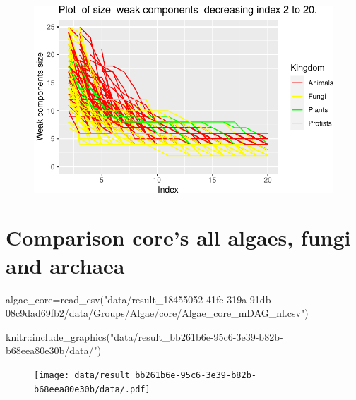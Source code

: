 \documentclass[
  letterpaper,
  DIV=11,
  numbers=noendperiod]{scrreprt}
\newenvironment{Shaded}{}{}
\newcommand{\FunctionTok}[1]{\textcolor[rgb]{0.38,0.69,0.94}{#1}}
\newcommand{\NormalTok}[1]{\textcolor[rgb]{0.67,0.70,0.75}{#1}}
\newcommand{\OtherTok}[1]{\textcolor[rgb]{0.15,0.68,0.38}{#1}}
\newcommand{\SpecialCharTok}[1]{\textcolor[rgb]{0.34,0.71,0.76}{#1}}
\newcommand{\StringTok}[1]{\textcolor[rgb]{0.60,0.76,0.47}{#1}}
\begin{document}
\begin{figure}[H]

{\centering \includegraphics[width=1\textwidth,height=\textheight]{index_files/figure-pdf/unnamed-chunk-52-1.pdf}

}

\end{figure}

\hypertarget{comparison-cores-all-algaes-fungi-and-archaea}{%
\section{Comparison core's all algaes, fungi and
archaea}\label{comparison-cores-all-algaes-fungi-and-archaea}}

\begin{Shaded}
\begin{Highlighting}[]
\NormalTok{algae\_core}\OtherTok{=}\FunctionTok{read\_csv}\NormalTok{(}\StringTok{"data/result\_18455052{-}41fe{-}319a{-}91db{-}08c9dad69fb2/data/Groups/Algae/core/Algae\_core\_mDAG\_nl.csv"}\NormalTok{) }
\end{Highlighting}
\end{Shaded}

\begin{Shaded}
\begin{Highlighting}[]
\NormalTok{knitr}\SpecialCharTok{::}\FunctionTok{include\_graphics}\NormalTok{(}\StringTok{"data/result\_bb261b6e{-}95c6{-}3e39{-}b82b{-}b68eea80e30b/data/"}\NormalTok{)}
\end{Highlighting}
\end{Shaded}

\begin{figure}[H]

{\centering \texttt{[image: data/result\_bb261b6e-95c6-3e39-b82b-b68eea80e30b/data/.pdf]}

}

\end{figure}
\end{document}
